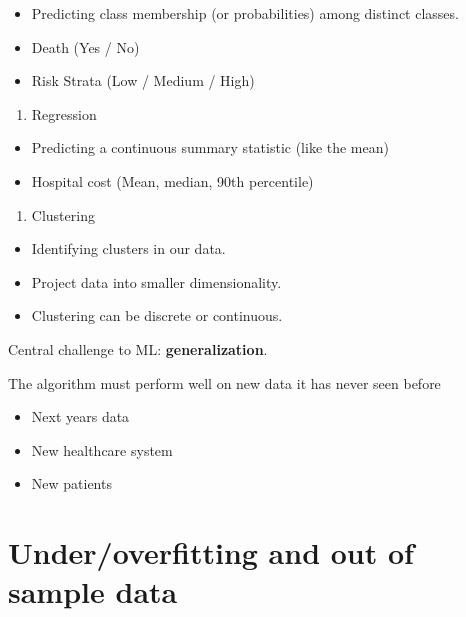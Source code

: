 \documentclass[fontset=fandol,zihao=false,scheme=chinese,heading=true,UTF8]{ctexbook}
\providecommand{\tightlist}{%
  \setlength{\itemsep}{0pt}\setlength{\parskip}{0pt}}
\begin{document}
\begin{itemize}
\tightlist
\item
  Predicting class membership (or probabilities) among distinct classes.
\item
  Death (Yes / No)
\item
  Risk Strata (Low / Medium / High)
\end{itemize}

\begin{enumerate}
\def\labelenumi{\arabic{enumi}.}
\setcounter{enumi}{1}
\tightlist
\item
  Regression
\end{enumerate}

\begin{itemize}
\tightlist
\item
  Predicting a continuous summary statistic (like the mean)
\item
  Hospital cost (Mean, median, 90th percentile)
\end{itemize}

\begin{enumerate}
\def\labelenumi{\arabic{enumi}.}
\setcounter{enumi}{2}
\tightlist
\item
  Clustering
\end{enumerate}

\begin{itemize}
\tightlist
\item
  Identifying clusters in our data.
\item
  Project data into smaller dimensionality.
\item
  Clustering can be discrete or continuous.
\end{itemize}

Central challenge to ML: \textbf{generalization}.

The algorithm must perform well on new data it has never seen before

\begin{itemize}
\tightlist
\item
  Next years data
\item
  New healthcare system
\item
  New patients
\end{itemize}

\hypertarget{underoverfitting-and-out-of-sample-data}{%
\section{Under/overfitting and out of sample data}\label{underoverfitting-and-out-of-sample-data}}
\end{document}
